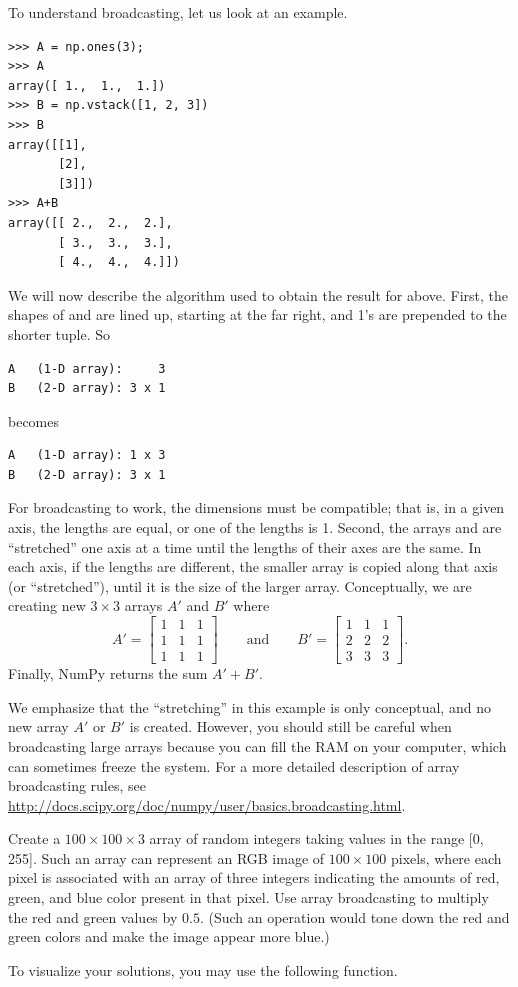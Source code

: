 To understand broadcasting, let us look at an example. 
\begin{lstlisting}
>>> A = np.ones(3);
>>> A
array([ 1.,  1.,  1.])
>>> B = np.vstack([1, 2, 3])
>>> B
array([[1],
       [2],
       [3]])
>>> A+B
array([[ 2.,  2.,  2.],
       [ 3.,  3.,  3.],
       [ 4.,  4.,  4.]])
\end{lstlisting}
We will now describe the algorithm used to obtain the result for  above. 
First, the shapes of  and  are lined up, starting at the far right, and 1's are prepended to the shorter tuple. So
\begin{lstlisting}
A 	(1-D array):     3
B	(2-D array): 3 x 1
\end{lstlisting}
becomes
\begin{lstlisting}
A 	(1-D array): 1 x 3
B	(2-D array): 3 x 1
\end{lstlisting}
For broadcasting to work, the dimensions must be compatible; that is, in a given axis, the lengths are equal, or one of the lengths is 1. 
Second, the arrays  and  are ``stretched'' one axis at a time until the lengths of their axes are the same. 
In each axis, if the lengths are different, the smaller array is copied along that axis (or ``stretched''), until it is the size of the larger array. 
Conceptually, we are creating new $3 \times 3$ arrays $A'$ and $B'$ where
\[
A' = \left[ \begin{array}{ccc}
1 & 1 & 1\\
1 & 1 & 1\\
1 & 1 & 1 \end{array} \right] \qquad \text{and} \qquad B' =  \left[ \begin{array}{ccc}
1 & 1 & 1\\
2 & 2 & 2\\
3 & 3 & 3\end{array} \right].
\]
Finally, NumPy returns the sum $A'+B'$.

We emphasize that the ``stretching'' in this example is only conceptual, and no new array $A'$ or $B'$ is created. However, 
you should still be careful when broadcasting large arrays because you can fill the 
RAM on your computer, which can sometimes freeze the system.
For a more detailed description of array broadcasting rules, see 
\url{http://docs.scipy.org/doc/numpy/user/basics.broadcasting.html}.

\begin{problem}
Create a $100\times100\times3$ array of random integers taking values in the range 
[0, 255]. Such an array can represent an RGB image of $100\times100$ pixels, 
where each pixel is associated with an array of three integers indicating the 
amounts of red, green, and blue color present in that pixel.
Use array broadcasting to multiply the red and green values by $0.5$. 
(Such an operation would tone down the red and green colors and make the 
image appear more blue.) 

To visualize your solutions, you may use the following function.
 
\end{problem}

